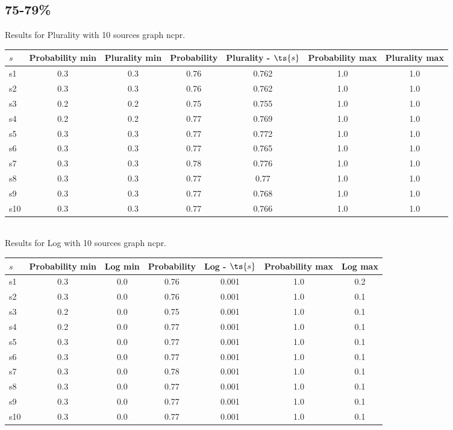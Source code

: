 \documentclass{article}
\begin{document}
\newpage

\subsection{75-79\%}

\noindent Results for Plurality with 10 sources graph ncpr.

\noindent\begin{tabular}{|l|c|c|c|c|c|c|}
\hline
$s$& Probability min & Plurality min & Probability & Plurality - $\ts{s}$ & Probability max & Plurality max\\
\hline
s1 &0.3 & 0.3 & 0.76 & 0.762 & 1.0 & 1.0\\
\hline
s2 &0.3 & 0.3 & 0.76 & 0.762 & 1.0 & 1.0\\
\hline
s3 &0.2 & 0.2 & 0.75 & 0.755 & 1.0 & 1.0\\
\hline
s4 &0.2 & 0.2 & 0.77 & 0.769 & 1.0 & 1.0\\
\hline
s5 &0.3 & 0.3 & 0.77 & 0.772 & 1.0 & 1.0\\
\hline
s6 &0.3 & 0.3 & 0.77 & 0.765 & 1.0 & 1.0\\
\hline
s7 &0.3 & 0.3 & 0.78 & 0.776 & 1.0 & 1.0\\
\hline
s8 &0.3 & 0.3 & 0.77 & 0.77 & 1.0 & 1.0\\
\hline
s9 &0.3 & 0.3 & 0.77 & 0.768 & 1.0 & 1.0\\
\hline
s10 &0.3 & 0.3 & 0.77 & 0.766 & 1.0 & 1.0\\
\hline
\end{tabular}\\

\noindent Results for Log with 10 sources graph ncpr.

\noindent\begin{tabular}{|l|c|c|c|c|c|c|}
\hline
$s$& Probability min & Log min & Probability & Log - $\ts{s}$ & Probability max & Log max\\
\hline
s1 &0.3 & 0.0 & 0.76 & 0.001 & 1.0 & 0.2\\
\hline
s2 &0.3 & 0.0 & 0.76 & 0.001 & 1.0 & 0.1\\
\hline
s3 &0.2 & 0.0 & 0.75 & 0.001 & 1.0 & 0.1\\
\hline
s4 &0.2 & 0.0 & 0.77 & 0.001 & 1.0 & 0.1\\
\hline
s5 &0.3 & 0.0 & 0.77 & 0.001 & 1.0 & 0.1\\
\hline
s6 &0.3 & 0.0 & 0.77 & 0.001 & 1.0 & 0.1\\
\hline
s7 &0.3 & 0.0 & 0.78 & 0.001 & 1.0 & 0.1\\
\hline
s8 &0.3 & 0.0 & 0.77 & 0.001 & 1.0 & 0.1\\
\hline
s9 &0.3 & 0.0 & 0.77 & 0.001 & 1.0 & 0.1\\
\hline
s10 &0.3 & 0.0 & 0.77 & 0.001 & 1.0 & 0.1\\
\hline
\end{tabular}\\
\end{document}
